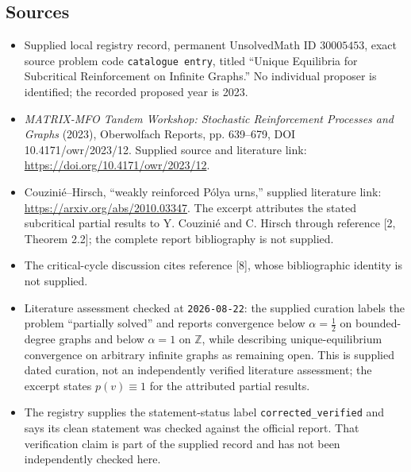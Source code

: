 \documentclass[11pt]{article}
\begin{document}
\subsection{Sources}
\begin{itemize}
\item Supplied local registry record, permanent UnsolvedMath ID \(30005453\), exact source problem code \texttt{catalogue entry}, titled ``Unique Equilibria for Subcritical Reinforcement on Infinite Graphs.'' No individual proposer is identified; the recorded proposed year is 2023.
\item \emph{MATRIX-MFO Tandem Workshop: Stochastic Reinforcement Processes and Graphs} (2023), Oberwolfach Reports, pp. 639--679, DOI 10.4171/owr/2023/12. Supplied source and literature link: \url{https://doi.org/10.4171/owr/2023/12}.
\item Couzini\'e--Hirsch, ``weakly reinforced P\'olya urns,'' supplied literature link: \url{https://arxiv.org/abs/2010.03347}. The excerpt attributes the stated subcritical partial results to Y. Couzini\'e and C. Hirsch through reference [2, Theorem 2.2]; the complete report bibliography is not supplied.
\item The critical-cycle discussion cites reference [8], whose bibliographic identity is not supplied.
\item Literature assessment checked at \texttt{2026-08-22}: the supplied curation labels the problem ``partially solved'' and reports convergence below \(\alpha=\tfrac12\) on bounded-degree graphs and below \(\alpha=1\) on \(\mathbb Z\), while describing unique-equilibrium convergence on arbitrary infinite graphs as remaining open. This is supplied dated curation, not an independently verified literature assessment; the excerpt states \(p(v)\equiv1\) for the attributed partial results.
\item The registry supplies the statement-status label \texttt{corrected\_verified} and says its clean statement was checked against the official report. That verification claim is part of the supplied record and has not been independently checked here.
\end{itemize}
\end{document}
